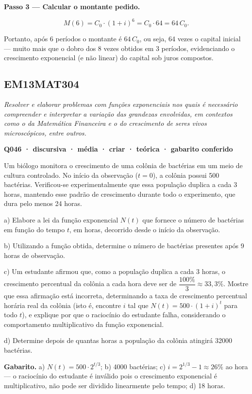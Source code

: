 \documentclass[11pt,a4paper]{article}
\begin{document}
\textbf{Passo 3 — Calcular o montante pedido.}

$$M(6) = C_0\cdot(1+i)^6 = C_0\cdot 64 = 64\,C_0.$$

Portanto, após 6 períodos o montante é $64\,C_0$, ou seja, 64 vezes o capital inicial — muito mais que o dobro dos 8 vezes obtidos em 3 períodos, evidenciando o crescimento exponencial (e não linear) do capital sob juros compostos.
\subsection*{EM13MAT304}
{\small\itshape Resolver e elaborar problemas com funções exponenciais nos quais é necessário compreender e interpretar a variação das grandezas envolvidas, em contextos como o da Matemática Financeira e o do crescimento de seres vivos microscópicos, entre outros.}

\bigskip\noindent\textbf{Q046 · discursiva · média · criar · teórica · gabarito conferido}\par\nopagebreak
Um biólogo monitora o crescimento de uma colônia de bactérias em um meio de cultura controlado. No início da observação ($t=0$), a colônia possui 500 bactérias. Verificou-se experimentalmente que essa população duplica a cada 3 horas, mantendo esse padrão de crescimento durante todo o experimento, que dura pelo menos 24 horas.

a) Elabore a lei da função exponencial $N(t)$ que fornece o número de bactérias em função do tempo $t$, em horas, decorrido desde o início da observação.

b) Utilizando a função obtida, determine o número de bactérias presentes após 9 horas de observação.

c) Um estudante afirmou que, como a população duplica a cada 3 horas, o crescimento percentual da colônia a cada hora deve ser de $\dfrac{100\%}{3}\approx 33{,}3\%$. Mostre que essa afirmação está incorreta, determinando a taxa de crescimento percentual horária real da colônia (isto é, encontre $i$ tal que $N(t) = 500\cdot(1+i)^t$ para todo $t$), e explique por que o raciocínio do estudante falha, considerando o comportamento multiplicativo da função exponencial.

d) Determine depois de quantas horas a população da colônia atingirá 32000 bactérias.

\textbf{Gabarito.} a) $N(t) = 500\cdot 2^{t/3}$; b) 4000 bactérias; c) $i = 2^{1/3}-1 \approx 26\%$ ao hora — o raciocínio do estudante é inválido pois o crescimento exponencial é multiplicativo, não pode ser dividido linearmente pelo tempo; d) 18 horas.
\end{document}
